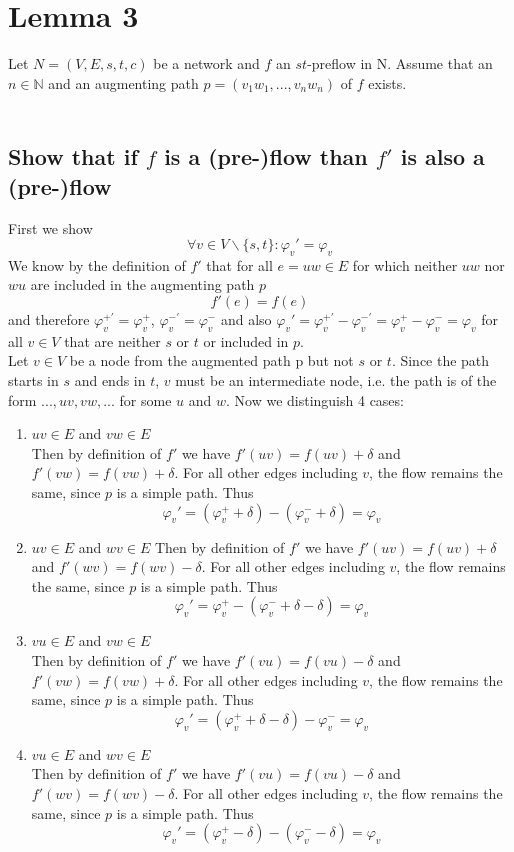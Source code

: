 \documentclass[10pt,a4paper]{article}
\begin{document}
	\section{Lemma 3}
	Let $N = (V, E, s, t, c)$ be a network  and $f$ an $st$-preflow in N.  Assume that an $n \in \mathbb{N}$  and an  augmenting path $p = (v_1w_1, ... ,v_nw_n)$ of $f$ exists. \\\\
	
	\subsection*{Show that if $f$ is a (pre-)flow than $f'$ is also a (pre-)flow}
	First we show
	\begin{equation}
	\label{eq:flux_same}
	\forall v \in V\backslash\{s,t\}: \varphi_v' = \varphi_v
	\end{equation}
	We know by the definition of $f'$ that for all $e = uw\in E$ for which neither $uw$ nor $wu$ are included in the augmenting path $p$
	$$f'(e) = f(e)$$
	and therefore $\varphi_v^{+\prime}  = \varphi_v^{+} $, $\varphi_v^{-\prime} = \varphi_v^-$ and also $\varphi_v' = \varphi_v^{+\prime} - \varphi_v^{-\prime} = \varphi_v^+ - \varphi_v^- = \varphi_v$ for all $v \in V$ that are neither $s$ or $t$ or included in $p$. \\
	Let $v \in V$ be a node from the augmented path p but not $s$ or $t$. Since the path starts in $s$ and ends in $t$, $v$ must be an intermediate node, i.e. the path is of the form $..., uv, vw,...$ for some $u$ and $w$.  Now we distinguish 4 cases:
	\begin{enumerate}
		\item $uv \in E$ and $vw \in E$ \\
		Then by definition of $f'$ we have $f'(uv) = f(uv) + \delta$ and $f'(vw) = f(vw) + \delta$. For all other edges including $v$, the flow remains the same, since $p$ is a simple path. Thus 
		$$\varphi_v' = (\varphi_v^+ + \delta) - (\varphi_v^- + \delta) = \varphi_v$$
		
		\item $uv \in E$ and $wv \in E$
		Then by definition of $f'$ we have $f'(uv) = f(uv) + \delta$ and $f'(wv) = f(wv) - \delta$. For all other edges including $v$, the flow remains the same, since $p$ is a simple path. Thus 
		$$\varphi_v' = \varphi_v^+ - (\varphi_v^- + \delta - \delta)= \varphi_v$$

		\item $vu \in E$ and $vw \in E$ \\
		Then by definition of $f'$ we have $f'(vu) = f(vu) - \delta$ and $f'(vw) = f(vw) + \delta$. For all other edges including $v$, the flow remains the same, since $p$ is a simple path. Thus 
		$$\varphi_v' = (\varphi_v^+ + \delta - \delta) - \varphi_v^- = \varphi_v$$
		
		\item $vu \in E$ and $wv \in E$ \\
		Then by definition of $f'$ we have $f'(vu) = f(vu) - \delta$ and $f'(wv) = f(wv) - \delta$. For all other edges including $v$, the flow remains the same, since $p$ is a simple path. Thus 
		$$\varphi_v' = (\varphi_v^+ - \delta) - (\varphi_v^- - \delta) = \varphi_v$$
	\end{enumerate}
\end{document}
